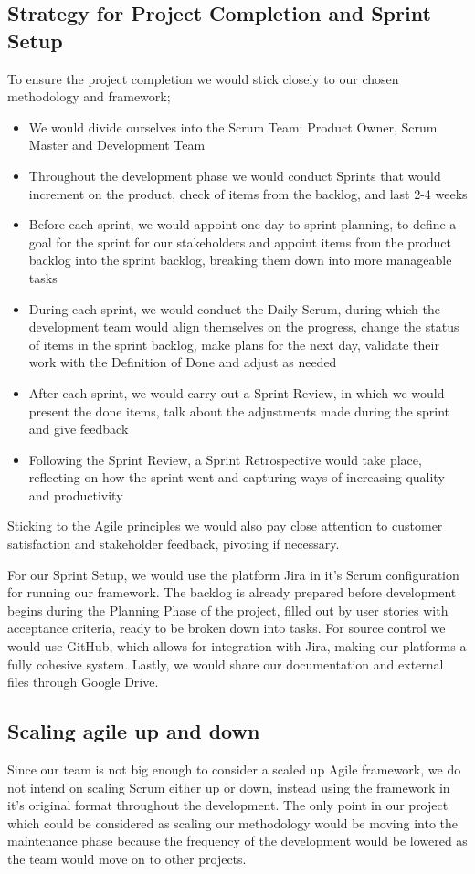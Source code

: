 \subsection{Strategy for Project Completion and Sprint Setup}
To ensure the project completion we would stick closely to our chosen methodology and framework;
\begin{itemize}
    \item We would divide ourselves into the Scrum Team: Product Owner, Scrum Master and Development Team
    \item Throughout the development phase we would conduct Sprints that would increment on the product, check of items from the backlog, and last 2-4 weeks
    \item Before each sprint, we would appoint one day to sprint planning, to define a goal for the sprint for our stakeholders and appoint items from the product backlog into the sprint backlog, breaking them down into more manageable tasks
    \item During each sprint, we would conduct the Daily Scrum, during which the development team would align themselves on the progress, change the status of items in the sprint backlog, make plans for the next day, validate their work with the Definition of Done and adjust as needed
    \item After each sprint, we would carry out a Sprint Review, in which we would present the done items, talk about the adjustments made during the sprint and give feedback
    \item Following the Sprint Review, a Sprint Retrospective would take place, reflecting on how the sprint went and capturing ways of increasing quality and productivity
\end{itemize}
Sticking to the Agile principles we would also pay close attention to customer satisfaction and stakeholder feedback, pivoting if necessary.

For our Sprint Setup, we would use the platform Jira in it's Scrum configuration for running our framework. The backlog is already prepared before
development begins during the Planning Phase of the project, filled out by user stories with acceptance criteria, ready to be broken
down into tasks. For source control we would use GitHub, which allows for integration with Jira, making our platforms a fully cohesive system.
Lastly, we would share our documentation and external files through Google Drive.

\subsection{Scaling agile up and down}
Since our team is not big enough to consider a scaled up Agile framework, we do not intend on scaling Scrum either up or down, instead
using the framework in it's original format throughout the development. The only point in our project which could be considered as scaling
our methodology would be moving into the maintenance phase because the frequency of the development would be lowered as the team would
move on to other projects.

